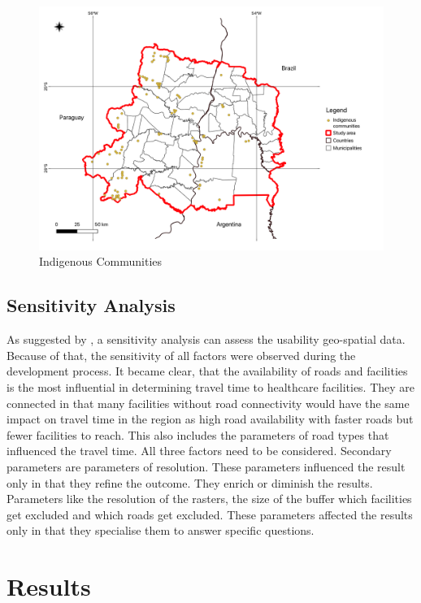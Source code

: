 \documentclass[11pt, a4paper]{report}
\begin{document}
\begin{figure}[H]
  \centering
  \includegraphics[width=0.9\linewidth]{figures/Indigenous Communities.png}
  \caption{Indigenous Communities}
  \label{fig:indigcom}
\end{figure}
    
\section{Sensitivity Analysis}
As suggested by \citet{frew_investigating_2017}, a sensitivity analysis can assess the usability geo-spatial data. Because of that, the sensitivity of all factors were observed during the development process. It became clear, that the availability of roads and facilities is the most influential in determining travel time to healthcare facilities. They are connected in that many facilities without road connectivity would have the same impact on travel time in the region as high road availability with faster roads but fewer facilities to reach. This also includes the parameters of road types that influenced the travel time. All three factors need to be considered. Secondary parameters are parameters of resolution. These parameters influenced the result only in that they refine the outcome. They enrich or diminish the results. Parameters like the resolution of the rasters, the size of the buffer which facilities get excluded and which roads get excluded. These parameters affected the results only in that they specialise them to answer specific questions.

\chapter{Results}
\end{document}
